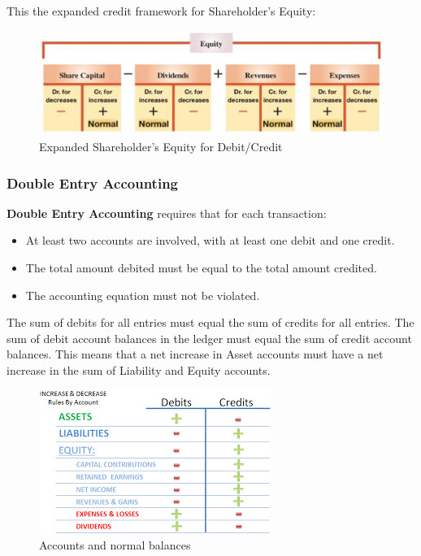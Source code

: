 \documentclass[../main.tex]{subfiles}
\begin{document}
	This the expanded credit framework for Shareholder's Equity:
	
	\begin{figure}[ht]
		\centering
		\includegraphics[width=1\columnwidth]{images/c2/expanded_framework.png}
		\caption{Expanded Shareholder's Equity for Debit/Credit}
	\end{figure}
	
	\subsubsection{Double Entry Accounting}
	
	\textbf{Double Entry Accounting} requires that for each transaction:
	\begin{itemize}[noitemsep]
		\item At least two accounts are involved, with at least one debit and 
		one credit.
		\item The total amount debited must be equal to the total amount 
		credited. 
		\item The accounting equation must not be violated. 
	\end{itemize}
	
	The sum of debits for all entries must equal the sum of credits for all 
	entries. The sum of debit account balances in the ledger must equal the sum 
	of credit account balances.  This means that a net increase in Asset 
	accounts must have a net increase in the sum of Liability and Equity 
	accounts. 
	
	\begin{figure}[ht]
		\centering
		\includegraphics[width=.6\columnwidth]{images/c2/credit_debit.png}
		\caption{Accounts and normal balances}
		\label{fig:accounts}
	\end{figure}
	
\end{document}
